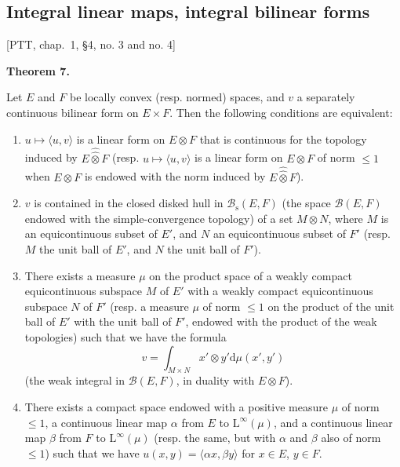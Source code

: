 \documentclass[british]{article}
\newenvironment{itenv}[1]
  {\phantomsection\par\smallskip\noindent\textbf{#1.}\itshape}
  {\par\smallskip}
\begin{document}
\subsection{Integral linear maps, integral bilinear
forms}\label{section-1.8}

{[}PTT, chap.~1, §4, no. 3 and no. 4{]} \medskip

\protect{}\label{section-1-theorem-7}
\begin{itenv}{Theorem 7}

Let \(E\) and \(F\) be locally convex (resp. normed) spaces, and \(v\) a
separately continuous bilinear form on \(E\times F\). Then the following
conditions are equivalent:

\begin{enumerate}
\def\labelenumi{\alph{enumi}.}
\item
  \(u\mapsto\langle u,v\rangle\) is a linear form on \(E\otimes F\) that
  is continuous for the topology induced by \(E\hat{\hat{\otimes}}F\)
  (resp. \(u\mapsto\langle u,v\rangle\) is a linear form on
  \(E\otimes F\) of norm \(\leqslant 1\) when \(E\otimes F\) is endowed
  with the norm induced by \(E\hat{\hat{\otimes}}F\)).
\item
  \(v\) is contained in the closed disked hull in
  \(\mathscr{B}_\mathrm{s}(E,F)\) (the space \(\mathscr{B}(E,F)\)
  endowed with the simple-convergence topology) of a set \(M\otimes N\),
  where \(M\) is an equicontinuous subset of \(E'\), and \(N\) an
  equicontinuous subset of \(F'\) (resp. \(M\) the unit ball of \(E'\),
  and \(N\) the unit ball of \(F'\)).
\item
  There exists a measure \(\mu\) on the product space of a weakly
  compact equicontinuous subspace \(M\) of \(E'\) with a weakly compact
  equicontinuous subspace \(N\) of \(F'\) (resp. a measure \(\mu\) of
  norm \(\leqslant 1\) on the product of the unit ball of \(E'\) with
  the unit ball of \(F'\), endowed with the product of the weak
  topologies) such that we have the formula \[
     v = \int_{M\times N} x'\otimes y' \mathrm{d}\mu(x',y')
   \] (the weak integral in \(\mathscr{B}(E,F)\), in duality with
  \(E\otimes F\)).
\item
  There exists a compact space endowed with a positive measure \(\mu\)
  of norm \(\leqslant 1\), a continuous linear map \(\alpha\) from \(E\)
  to \(\mathrm{L}^\infty(\mu)\), and a continuous linear map \(\beta\)
  from \(F\) to \(\mathrm{L}^\infty(\mu)\) (resp. the same, but with
  \(\alpha\) and \(\beta\) also of norm \(\leqslant 1\)) such that we
  have \(u(x,y)=\langle\alpha x,\beta y\rangle\) for \(x\in E\),
  \(y\in F\).
\end{enumerate}

\end{itenv}
\end{document}
